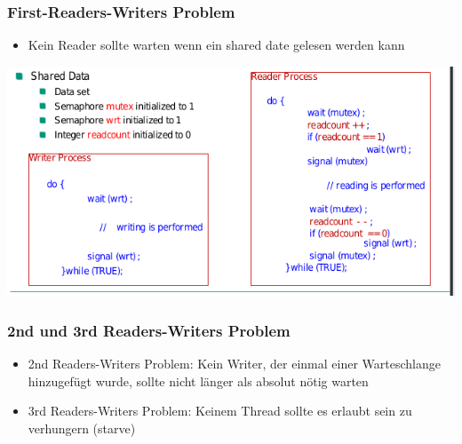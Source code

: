 \documentclass[a4paper]{scrreprt}
\begin{document}
			\subsubsection{First-Readers-Writers Problem}
				\begin{itemize}
					\item Kein Reader sollte warten wenn ein shared date gelesen werden kann
				\end{itemize}	
			\includegraphics[scale=0.6] {readerwriterprob.png}
			
			\subsubsection{2nd und 3rd Readers-Writers Problem}
				\begin{itemize}
					\item 2nd Readers-Writers Problem: Kein Writer, der einmal einer Warteschlange hinzugefügt wurde, sollte nicht länger als absolut nötig warten
					\item 3rd Readers-Writers Problem: Keinem Thread sollte es erlaubt sein zu verhungern (starve)
				\end{itemize}
\end{document}
